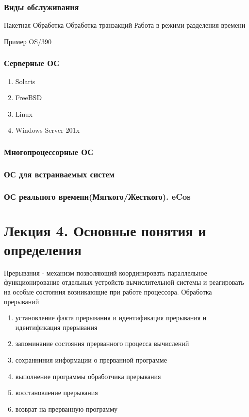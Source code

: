 \documentclass[a4paper]{article}
\begin{document}
\subsubsection{Виды обслуживания}
Пакетная Обработка
Обработка транзакций
Работа в режими разделения времени

Пример OS/390


\subsubsection{Серверные ОС}
\begin{enumerate}
\item Solaris
\item FreeBSD
\item Linux
\item Windows Server 201x
\end{enumerate}

\subsubsection{Многопроцессорные ОС}
\subsubsection{ОС для встраиваемых систем}
\subsubsection{ОС реального времени(Мягкого/Жесткого). eCos}


\section{Лекция 4. Основные понятия и определения}
Прерывания - механизм позволяющий координировать параллельное функционирование отдельных устройств вычислительной системы и реагировать на особые состояния возникающие при работе процессора. 
Обработка прерываний
\begin{enumerate}
    \item установление факта прерывания и идентификация прерывания и идентификация прерывания
    \item запоминание состояния прерванного процесса вычислений
    \item сохранниния информации о прерванной программе
    \item выполнение программы обработчика прерывания
    \item восстановление прерывания
    \item возврат на прерванную программу
\end{enumerate}
\end{document}
